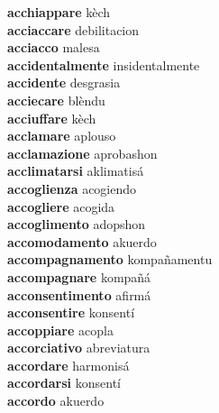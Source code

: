 \textbf{acchiappare } kèch \\
\textbf{acciaccare } debilitacion \\
\textbf{acciacco } malesa \\
\textbf{accidentalmente } insidentalmente \\
\textbf{accidente } desgrasia \\
\textbf{acciecare } blèndu \\
\textbf{acciuffare } kèch \\
\textbf{acclamare } aplouso \\
\textbf{acclamazione } aprobashon \\
\textbf{acclimatarsi } aklimatisá \\
\textbf{accoglienza } acogiendo \\
\textbf{accogliere } acogida \\
\textbf{accoglimento } adopshon \\
\textbf{accomodamento } akuerdo \\
\textbf{accompagnamento } kompañamentu \\
\textbf{accompagnare } kompañá \\
\textbf{acconsentimento } afirmá \\
\textbf{acconsentire } konsentí \\
\textbf{accoppiare } acopla \\
\textbf{accorciativo } abreviatura \\
\textbf{accordare } harmonisá \\
\textbf{accordarsi } konsentí \\
\textbf{accordo } akuerdo \\

